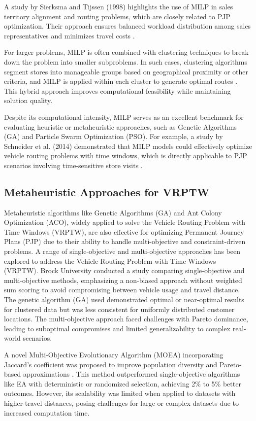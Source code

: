 A study by Sierksma and Tijssen (1998) highlights the use of MILP in sales territory alignment and routing problems, which are closely related to PJP optimization. Their approach ensures balanced workload distribution among sales representatives and minimizes travel costs \cite{Sierksma1998}.

For larger problems, MILP is often combined with clustering techniques to break down the problem into smaller subproblems. In such cases, clustering algorithms segment stores into manageable groups based on geographical proximity or other criteria, and MILP is applied within each cluster to generate optimal routes \cite{Nagy2007}. This hybrid approach improves computational feasibility while maintaining solution quality.

Despite its computational intensity, MILP serves as an excellent benchmark for evaluating heuristic or metaheuristic approaches, such as Genetic Algorithms (GA) and Particle Swarm Optimization (PSO). For example, a study by Schneider et al. (2014) demonstrated that MILP models could effectively optimize vehicle routing problems with time windows, which is directly applicable to PJP scenarios involving time-sensitive store visits \cite{Schneider2014}.

\subsection{Metaheuristic Approaches for VRPTW}
Metaheuristic algorithms like Genetic Algorithms (GA) and Ant Colony Optimization (ACO), widely applied to solve the Vehicle Routing Problem with Time Windows (VRPTW), are also effective for optimizing Permanent Journey Plans (PJP) due to their ability to handle multi-objective and constraint-driven problems.
A range of single-objective and multi-objective approaches has been explored to address the Vehicle Routing Problem with Time Windows (VRPTW). Brock University conducted a study \cite{ombuki2006multi} comparing single-objective and multi-objective methods, emphasizing a non-biased approach without weighted sum scoring to avoid compromising between vehicle usage and travel distance. The genetic algorithm (GA) used demonstrated optimal or near-optimal results for clustered data but was less consistent for uniformly distributed customer locations. The multi-objective approach faced challenges with Pareto dominance, leading to suboptimal compromises and limited generalizability to complex real-world scenarios.

A novel Multi-Objective Evolutionary Algorithm (MOEA) incorporating Jaccard’s coefficient was proposed to improve population diversity and Pareto-based approximations \cite{Garcia-Najera_Bullinaria_2011}. This method outperformed single-objective algorithms like EA with deterministic or randomized selection, achieving 2\% to 5\% better outcomes. However, its scalability was limited when applied to datasets with higher travel distances, posing challenges for large or complex datasets due to increased computation time.

